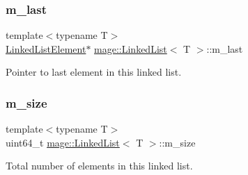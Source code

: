\subsubsection{\texorpdfstring{m\+\_\+last}{m\_last}}
{\footnotesize\ttfamily template$<$typename T$>$ \\
\hyperlink{structmage_1_1_linked_list_1_1_linked_list_element}{Linked\+List\+Element}$\ast$ \hyperlink{classmage_1_1_linked_list}{mage\+::\+Linked\+List}$<$ T $>$\+::m\+\_\+last\hspace{0.3cm}{\ttfamily [private]}}

Pointer to last element in this linked list. \hypertarget{classmage_1_1_linked_list_a1a1be1f46f0bc704e6387833b9528909}{}\label{classmage_1_1_linked_list_a1a1be1f46f0bc704e6387833b9528909} 
\subsubsection{\texorpdfstring{m\+\_\+size}{m\_size}}
{\footnotesize\ttfamily template$<$typename T$>$ \\
uint64\+\_\+t \hyperlink{classmage_1_1_linked_list}{mage\+::\+Linked\+List}$<$ T $>$\+::m\+\_\+size\hspace{0.3cm}{\ttfamily [private]}}

Total number of elements in this linked list. 